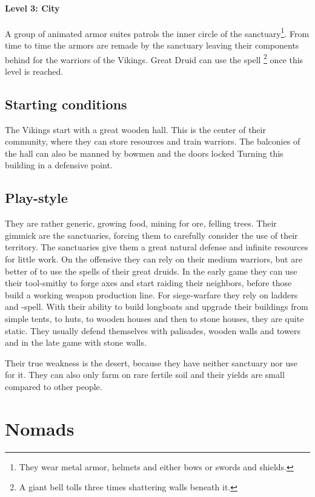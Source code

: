 \documentclass[a4paper]{book}
\begin{document}
			\paragraph{Level 3: City}
				A group of animated armor suites patrols the inner circle of the sanctuary\footnote{
					They wear metal armor, helmets and either bows or swords and shields.
				}.
				From time to time the armors are remade by the sanctuary leaving their
				components behind for the warriors of the \gls{Vikings}.
				Great Druid can use the spell \footnote{
					A giant bell tolls three times shattering walls beneath it.
				} once this level is reached.

	\subsection{Starting conditions}
		The \gls{Vikings} start with a great wooden hall.
		This is the center of their community, where they can store resources
		and train warriors.
		The balconies of the hall can also be manned by bowmen and the doors locked
		Turning this building in a defensive point.

	\subsection{Play-style}
		They are rather generic, growing food, mining for ore, felling trees.
		Their gimmick are the sanctuaries, forcing them to carefully consider the use of their territory.
		The sanctuaries give them a great natural defense and infinite resources for little work.
		On the offensive they can rely on their medium warriors,
		but are better of to use the spells of their great druids.
		In the early game they can use their tool-smithy to forge axes and start raiding their neighbors,
		before those build a working weapon production line.
		For siege-warfare they rely on ladders and -spell.
		With their ability to build longboats and upgrade their buildings from simple tents,
		to huts, to wooden houses  and then to stone houses, they are quite static.
		They usually defend themselves with palisades, wooden walls and towers and in the
		late game with stone walls.

		Their true weakness is the desert, because they have neither sanctuary nor use for it.
		They can also only farm on rare fertile soil and their yields are small compared to
		other people.

\section{\Gls{Nomads}}
\end{document}
